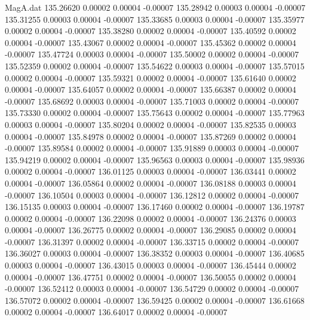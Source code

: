 \begin{filecontents}{MagA.dat}
 135.26620    0.00002    0.00004   -0.00007
 135.28942    0.00003    0.00004   -0.00007
 135.31255    0.00003    0.00004   -0.00007
 135.33685    0.00003    0.00004   -0.00007
 135.35977    0.00002    0.00004   -0.00007
 135.38280    0.00002    0.00004   -0.00007
 135.40592    0.00002    0.00004   -0.00007
 135.43067    0.00002    0.00004   -0.00007
 135.45362    0.00002    0.00004   -0.00007
 135.47724    0.00003    0.00004   -0.00007
 135.50002    0.00002    0.00004   -0.00007
 135.52359    0.00002    0.00004   -0.00007
 135.54622    0.00003    0.00004   -0.00007
 135.57015    0.00002    0.00004   -0.00007
 135.59321    0.00002    0.00004   -0.00007
 135.61640    0.00002    0.00004   -0.00007
 135.64057    0.00002    0.00004   -0.00007
 135.66387    0.00002    0.00004   -0.00007
 135.68692    0.00003    0.00004   -0.00007
 135.71003    0.00002    0.00004   -0.00007
 135.73330    0.00002    0.00004   -0.00007
 135.75643    0.00002    0.00004   -0.00007
 135.77963    0.00003    0.00004   -0.00007
 135.80204    0.00002    0.00004   -0.00007
 135.82535    0.00003    0.00004   -0.00007
 135.84978    0.00002    0.00004   -0.00007
 135.87269    0.00002    0.00004   -0.00007
 135.89584    0.00002    0.00004   -0.00007
 135.91889    0.00003    0.00004   -0.00007
 135.94219    0.00002    0.00004   -0.00007
 135.96563    0.00003    0.00004   -0.00007
 135.98936    0.00002    0.00004   -0.00007
 136.01125    0.00003    0.00004   -0.00007
 136.03441    0.00002    0.00004   -0.00007
 136.05864    0.00002    0.00004   -0.00007
 136.08188    0.00003    0.00004   -0.00007
 136.10504    0.00003    0.00004   -0.00007
 136.12812    0.00002    0.00004   -0.00007
 136.15135    0.00003    0.00004   -0.00007
 136.17460    0.00002    0.00004   -0.00007
 136.19787    0.00002    0.00004   -0.00007
 136.22098    0.00002    0.00004   -0.00007
 136.24376    0.00003    0.00004   -0.00007
 136.26775    0.00002    0.00004   -0.00007
 136.29085    0.00002    0.00004   -0.00007
 136.31397    0.00002    0.00004   -0.00007
 136.33715    0.00002    0.00004   -0.00007
 136.36027    0.00003    0.00004   -0.00007
 136.38352    0.00003    0.00004   -0.00007
 136.40685    0.00003    0.00004   -0.00007
 136.43015    0.00003    0.00004   -0.00007
 136.45444    0.00002    0.00004   -0.00007
 136.47751    0.00002    0.00004   -0.00007
 136.50055    0.00002    0.00004   -0.00007
 136.52412    0.00003    0.00004   -0.00007
 136.54729    0.00002    0.00004   -0.00007
 136.57072    0.00002    0.00004   -0.00007
 136.59425    0.00002    0.00004   -0.00007
 136.61668    0.00002    0.00004   -0.00007
 136.64017    0.00002    0.00004   -0.00007

\end{filecontents}
